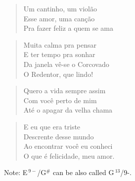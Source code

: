 \documentclass[12pt]{article}
\begin{document}
{%

\begin{verse}
   Um cantinho, um viol\~{a}o
\\ Esse amor, uma can{\c{c}}\~{a}o
\\ Pra fazer feliz a quem se ama
\end{verse}

\begin{verse}
   Muita calma pra pensar
\\ E ter tempo pra sonhar
\\ Da janela v\^{e}-se o Corcovado
\\ O Redentor, que lindo!
\end{verse}

\begin{verse}
   Quero a vida sempre assim
\\ Com voc\^{e} perto de mim
\\ At\'{e} o apagar da velha chama
\end{verse}

\begin{verse}
   E eu que era triste
\\ Descrente desse mundo
\\ Ao encontrar voc\^{e} eu conheci
\\ O que \'{e} felicidade, meu amor.
\end{verse}

}

\newpage
Note: E${\,}^{9-}$/G${}^{\#}$ can be also called G${\,}^{13}$/9-.
\end{document}
